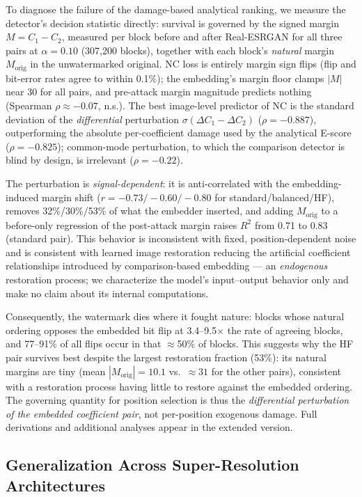 \documentclass[conference]{IEEEtran}
\begin{document}
To diagnose the failure of the damage-based analytical ranking, we
measure the detector's decision statistic directly: survival is
governed by the signed margin $M = C_1 - C_2$, measured per block
before and after Real-ESRGAN for all three pairs at $\alpha = 0.10$
(307,200 blocks), together with each block's \emph{natural} margin
$M_{\mathrm{orig}}$ in the unwatermarked original. NC loss is entirely
margin sign flips (flip and bit-error rates agree to within 0.1\%);
the embedding's margin floor clamps $|M|$ near 30 for all pairs, and
pre-attack margin magnitude predicts nothing (Spearman
$\rho \approx -0.07$, n.s.). The best image-level predictor of NC is
the standard deviation of the \emph{differential} perturbation
$\sigma(\Delta C_1 - \Delta C_2)$ ($\rho = -0.887$), outperforming the
absolute per-coefficient damage used by the analytical E-score
($\rho = -0.825$); common-mode perturbation, to which the comparison
detector is blind by design, is irrelevant ($\rho = -0.22$).

The perturbation is \emph{signal-dependent}: it is anti-correlated
with the embedding-induced margin shift
($r = -0.73 / -0.60 / -0.80$ for standard/balanced/HF), removes
32\%/30\%/53\% of what the embedder inserted, and adding
$M_{\mathrm{orig}}$ to a before-only regression of the post-attack
margin raises $R^2$ from 0.71 to 0.83 (standard pair). This behavior
is inconsistent with fixed, position-dependent noise and is consistent
with learned image restoration reducing the artificial coefficient
relationships introduced by comparison-based embedding --- an
\emph{endogenous} restoration process; we characterize the model's
input--output behavior only and make no claim about its internal
computations.

Consequently, the watermark dies where it fought nature: blocks whose
natural ordering opposes the embedded bit flip at 3.4--9.5$\times$ the
rate of agreeing blocks, and 77--91\% of all flips occur in that
$\approx$50\% of blocks. This suggests why the HF pair survives best
despite the largest restoration fraction (53\%): its natural margins
are tiny (mean $|M_{\mathrm{orig}}| = 10.1$ vs.\ $\approx 31$ for the
other pairs), consistent with a restoration process having little to
restore against the embedded ordering. The governing quantity for
position selection is thus the \emph{differential perturbation of the
embedded coefficient pair}, not per-position exogenous damage. Full
derivations and additional analyses appear in the extended version.

\subsection{Generalization Across Super-Resolution Architectures}
\label{sec:generalization}
\end{document}
